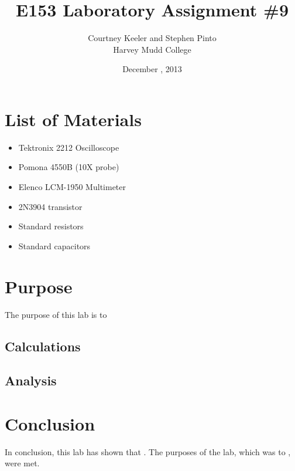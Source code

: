 \documentclass[12pt,letterpaper]{report}
\begin{document}
\title{E153 Laboratory Assignment \#9}
\author{Courtney Keeler and Stephen Pinto\\
Harvey Mudd College}
\date{December , 2013}
\maketitle

\section*{List of Materials}
\begin{itemize}
	\item Tektronix 2212 Oscilloscope
	\item Pomona 4550B (10X probe)
	\item Elenco LCM-1950 Multimeter
	\item 2N3904 transistor
	\item Standard resistors
	\item Standard capacitors
\end{itemize}

\section*{Purpose}
The purpose of this lab is to 


\subsection*{Calculations}


\subsection*{Analysis}


\section*{Conclusion}

In conclusion, this lab has shown that 
. The purposes of the lab, which was to , were met.
\end{document}
